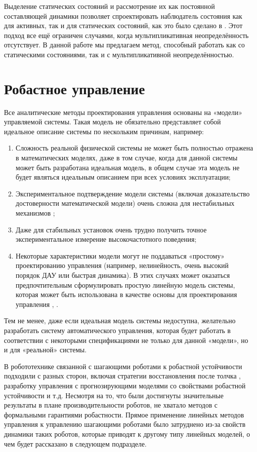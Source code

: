Выделение статических состояний и рассмотрение их как постоянной составляющей динамики позволяет спроектировать наблюдатель состояния как для активных, так и для статических состояний, как это было сделано в \cite{SAVIN2021}. Этот подход все ещё ограничен случаями, когда мультипликативная неопределённость отсутствует. В данной работе мы предлагаем метод, способный работать как со статическими состояниями, так и с мультипликативной неопределённостью.

\section{Робастное управление}\label{sec:ch1/sec4}
Все аналитические методы проектирования управления основаны на «модели» управляемой системы. Такая модель не обязательно представляет собой идеальное описание системы по нескольким причинам, например:
\begin{enumerate}[beginpenalty=10000]
	\item Сложность реальной физической системы не может быть полностью отражена в математических моделях, даже в том случае, когда для данной системы может быть разработана идеальная модель, в общем случае эта модель не будет являться идеальным описанием при всех условиях эксплуатации;
	\item Экспериментальное подтверждение модели системы (включая доказательство достоверности математической модели) очень сложна для нестабильных механизмов \cite{Oral2022};
	\item Даже для стабильных установок очень трудно получить точное экспериментальное измерение высокочастотного поведения;
	\item Некоторые характеристики модели могут не поддаваться «простому» проектированию управления (например, нелинейность, очень высокий порядок ДАУ или быстрая динамика). В этих случаях может оказаться предпочтительным сформулировать простую линейную модель системы, которая может быть использована в качестве основы для проектирования управления \cite{barmish1994new}, \cite{Garulli2000}.
\end{enumerate}

Тем не менее, даже если идеальная модель системы недоступна, желательно разработать систему автоматического управления, которая будет работать в соответствии с некоторыми спецификациями не только для данной «модели», но и для «реальной» системы.

В робототехнике связанной с шагающими роботами к робастной устойчивости подходили с разных сторон, включая стратегии восстановления после толчка \cite{Pratt2006}, разработку управления с прогнозирующими моделями со свойствами робастной устойчивости \cite{KIM2019} и т.д. Несмотря на то, что были достигнуты значительные результаты в плане производительности роботов, не хватало методов с формальными гарантиями робастности. Прямое применение линейных методов управления к управлению шагающими роботами было затруднено из-за свойств динамики таких роботов, которые приводят к другому типу линейных моделей, о чем будет рассказано в следующем подразделе.

